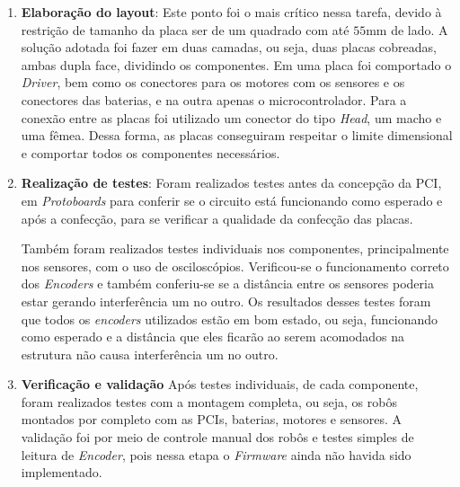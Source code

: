 \begin{enumerate}
    \item \textbf{Elaboração do layout}:
        Este ponto foi o mais crítico nessa tarefa, devido à restrição de tamanho da placa ser de um quadrado com até $55$mm de lado. A solução adotada foi fazer em duas camadas, ou seja, duas placas cobreadas, ambas dupla face, dividindo os componentes. Em uma placa foi comportado o \textit{Driver}, bem como os conectores para os motores com os sensores e os conectores das baterias, e na outra apenas o microcontrolador. Para a conexão entre as placas foi utilizado um conector do tipo \textit{Head}, um macho e uma fêmea. Dessa forma, as placas conseguiram respeitar o limite dimensional e comportar todos os componentes necessários.
    \item \textbf{Realização de testes}:
        Foram realizados testes antes da concepção da PCI, em \textit{Protoboards} para conferir se o circuito está funcionando como esperado e após a confecção, para se verificar a qualidade da confecção das placas.
        
        Também foram realizados testes individuais nos componentes, principalmente nos sensores, com o uso de osciloscópios. Verificou-se o funcionamento correto dos \textit{Encoders} e também conferiu-se se a distância entre os sensores poderia estar gerando interferência um no outro. Os resultados desses testes foram que todos os \textit{encoders} utilizados estão em bom estado, ou seja, funcionando como esperado e a distância que eles ficarão ao serem acomodados na estrutura não causa interferência um no outro.
    \item \textbf{Verificação e validação}
        Após testes individuais, de cada componente, foram realizados testes com a montagem completa, ou seja, os robôs montados por completo com as PCIs, baterias, motores e sensores. A validação foi por meio de controle manual dos robôs e testes simples de leitura de \textit{Encoder}, pois nessa etapa o \textit{Firmware} ainda não havida sido implementado.
\end{enumerate}